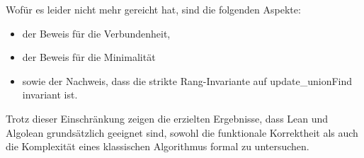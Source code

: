 Wofür es leider nicht mehr gereicht hat, sind die folgenden Aspekte:
\begin{itemize}
    \item der Beweis für die Verbundenheit,
    \item der Beweis für die Minimalität
    \item sowie der Nachweis, dass die strikte Rang-Invariante auf update\_unionFind invariant ist.
\end{itemize}

Trotz dieser Einschränkung zeigen die erzielten Ergebnisse, dass Lean und Algolean grundsätzlich geeignet sind, sowohl die funktionale Korrektheit als auch die Komplexität eines klassischen Algorithmus formal zu untersuchen.
